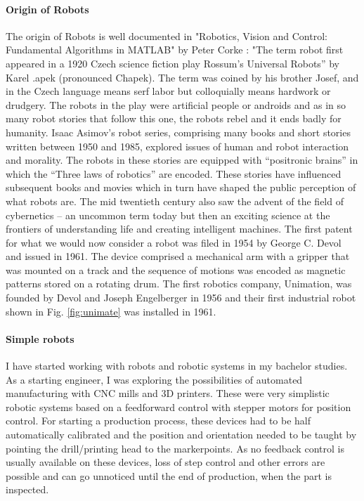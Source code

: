 \paragraph{Origin of Robots}
The origin of Robots is well documented in "Robotics, Vision and Control: Fundamental Algorithms in MATLAB" by Peter Corke \cite{CorkeRoboticVisionControl}:
"The term robot ﬁrst appeared in a 1920 Czech science ﬁction play Rossum’s Universal Robots” by Karel .apek (pronounced Chapek). 
The term was coined by his brother Josef, and in the Czech language means serf labor but colloquially means hardwork or drudgery. 
The robots in the play were artiﬁcial people or androids and as in so many robot stories that follow this one, the robots rebel and it ends badly for humanity. 
Isaac Asimov’s robot series, comprising many books and short stories written between 1950 and 1985, explored issues of human and robot interaction and morality. 
The robots in these stories are equipped with “positronic brains” in which the “Three laws of robotics” are encoded. These stories have inﬂuenced subsequent books and movies which in turn have shaped the public perception of what robots are. 
The mid twentieth century also saw the advent of the ﬁeld of cybernetics  – an uncommon term today but then an exciting science at the frontiers of understanding life and creating intelligent machines.
The ﬁrst patent for what we would now consider a robot was ﬁled in 1954 by George C. Devol and issued in 1961. 
The device comprised a mechanical arm with a gripper that was mounted on a track and the sequence of motions was encoded as magnetic patterns stored on a rotating drum. 
The ﬁrst robotics company, Unimation, was founded by Devol and Joseph Engelberger in 1956 and their ﬁrst industrial robot shown in Fig. \ref{fig:unimate} was installed in 1961. \cite{CorkeRoboticVisionControl}
\medskip



\paragraph{Simple robots}
I have started working with robots and robotic systems in my bachelor studies. 
As a starting engineer, I was exploring the possibilities of automated manufacturing with CNC mills and 3D printers. 
These were very simplistic robotic systems based on a feedforward control with stepper motors for position control. 
For starting a production process, these devices had to be half automatically calibrated and the position and orientation needed to be taught by pointing the drill/printing head to the markerpoints. 
As no feedback control is usually available on these devices, loss of step control and other errors are possible and can go unnoticed until the end of production, when the part is inspected.
\medskip



